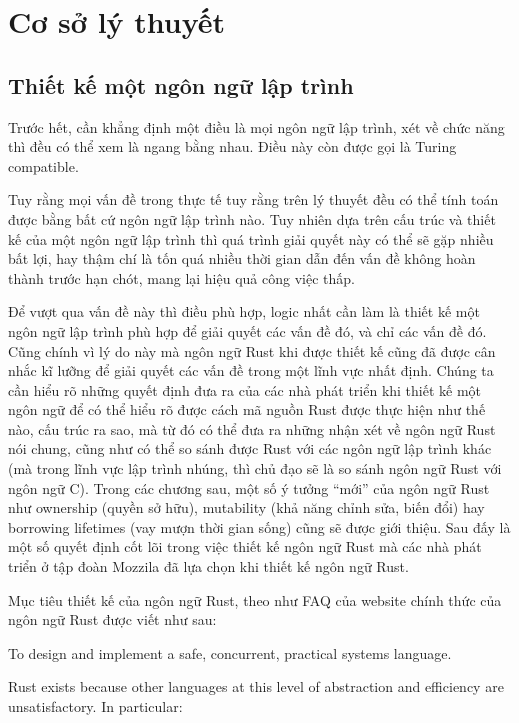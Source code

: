 \chapter{Cơ sở lý thuyết}\label{ch2-top}
\section{Thiết kế một ngôn ngữ lập trình}
Trước hết, cần khẳng định một điều là mọi ngôn ngữ lập trình, xét về chức năng thì đều có thể xem là ngang bằng nhau.
Điều này còn được gọi là Turing compatible.

Tuy rằng mọi vấn đề trong thực tế tuy rằng trên lý thuyết đều có thể tính toán được bằng bất cứ ngôn ngữ lập trình nào.%
Tuy nhiên dựa trên cấu trúc và thiết kế của một ngôn ngữ lập trình thì quá trình giải quyết này có thể sẽ gặp nhiều bất lợi, hay thậm chí là tốn quá nhiều thời gian dẫn đến vấn đề không hoàn thành trước hạn chót, mang lại hiệu quả công việc thấp.

Để vượt qua vấn đề này thì điều phù hợp, logic nhất cần làm là thiết kế một ngôn ngữ lập trình phù hợp để giải quyết các vấn đề đó, và chỉ các vấn đề đó.
Cũng chính vì lý do này mà ngôn ngữ Rust khi được thiết kế cũng đã được cân nhắc kĩ lưỡng để giải quyết các vấn đề trong một lĩnh vực nhất định.
Chúng ta cần hiểu rõ những quyết định đưa ra của các nhà phát triển khi thiết kế một ngôn ngữ để có thể hiểu rõ được cách mã nguồn Rust được thực hiện như thế nào, cấu trúc ra sao, mà từ đó có thể đưa ra những nhận xét về ngôn ngữ Rust nói chung, cũng như có thể so sánh được Rust với các ngôn ngữ lập trình khác (mà trong lĩnh vực lập trình nhúng, thì chủ đạo sẽ là so sánh ngôn ngữ Rust với ngôn ngữ C).
Trong các chương sau, một số ý tưởng ``mới'' của ngôn ngữ Rust như ownership (quyền sở hữu), mutability (khả năng chỉnh sửa, biến đổi) hay borrowing lifetimes (vay mượn thời gian sống) cũng sẽ được giới thiệu.
Sau đấy là một số quyết định cốt lõi trong việc thiết kế ngôn ngữ Rust mà các nhà phát triển ở tập đoàn Mozzila đã lựa chọn khi thiết kế ngôn ngữ Rust.

Mục tiêu thiết kế của ngôn ngữ Rust, theo như FAQ của website chính thức của ngôn ngữ Rust được viết như sau:
\bigskip

To design and implement a safe, concurrent, practical systems language.

Rust exists because other languages at this level of abstraction and efficiency are unsatisfactory. In particular:

